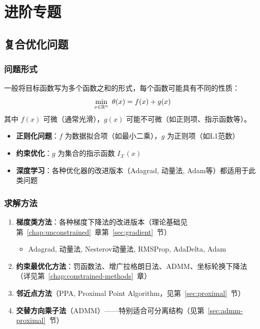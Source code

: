 \chapter{进阶专题}\label{chap:advanced}
\section{复合优化问题}\label{sec:composite}

\subsection{问题形式}

\begin{definition}[复合优化问题]
一般将目标函数写为多个函数之和的形式，每个函数可能具有不同的性质：
\[
\min_{x \in \mathbb{R}^n}\ \theta(x) = f(x) + g(x)
\]
其中 $f(x)$ 可微（通常光滑），$g(x)$ 可能不可微（如正则项、指示函数等）。
\end{definition}

\begin{conceptbox}[典型应用]
\begin{itemize}[itemsep=0.3em]
    \item \textbf{正则化问题}：$f$ 为数据拟合项（如最小二乘），$g$ 为正则项（如L1范数）
    \item \textbf{约束优化}：$g$ 为集合的指示函数 $I_\mathcal{X}(x)$
    \item \textbf{深度学习}：各种优化器的改进版本（Adagrad, 动量法, Adam等）都适用于此类问题
\end{itemize}
\end{conceptbox}

\subsection{求解方法}

\begin{notebox}[可用方法汇总]
\begin{enumerate}[label=\arabic*., leftmargin=2em]
    \item \textbf{梯度类方法}：各种梯度下降法的改进版本（理论基础见第~\ref{chap:unconstrained}~章第~\ref{sec:gradient}~节）
    \begin{itemize}
        \item Adagrad, 动量法, Nesterov动量法, RMSProp, AdaDelta, Adam
    \end{itemize}
    \item \textbf{约束最优化方法}：罚函数法、增广拉格朗日法、ADMM、坐标轮换下降法（详见第~\ref{chap:constrained-methods}~章）
    \item \textbf{邻近点方法}（PPA, Proximal Point Algorithm，见第~\ref{sec:proximal}~节）
    \item \textbf{交替方向乘子法}（ADMM）——特别适合可分离结构（见第~\ref{sec:admm-proximal}~节）
\end{enumerate}
\end{notebox}

